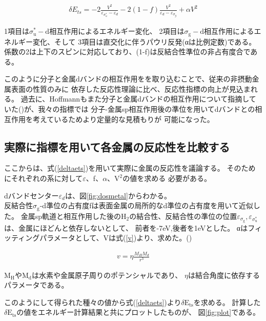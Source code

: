 \documentclass[12pt]{ltjsarticle}
\begin{document}
\begin{eqnarray}
    \label{deltaets}
    \delta E_{ts} = -2 \frac{ V^2 }{\varepsilon _{\sigma_u^*} - \varepsilon _d}
                    -2(1-f)\frac{V^2}{\varepsilon _d - \varepsilon _{\sigma_g}}
                    + \alpha V^2
\end{eqnarray}

1項目は$\sigma _\text{u}^* -\text{d}$相互作用によるエネルギー変化、
2項目は$\sigma _\text{g}-\text{d}$相互作用によるエネルギー変化、そして
3項目は直交化に伴うパウリ反発(αは比例定数)である。
係数の2は上下のスピンに対応しており、(1-f)は反結合性準位の非占有度合である。

このように分子と金属dバンドの相互作用をを取り込むことで、従来の非摂動金属表面の性質のみに
依存した反応性理論に比べ、反応性指標の向上が見込まれる。
過去に、Hoffmannもまた分子と金属dバンドの相互作用について指摘していた(\cite{Hoffman1988})が、我々の指標では
分子-金属sp相互作用後の準位を用いてdバンドとの相互作用を考えているためより定量的な見積もりが
可能になった。

\subsection{実際に指標を用いて各金属の反応性を比較する}
ここからは、式(\ref{deltaets})を用いて実際に金属の反応性を議論する。
そのためにそれぞれの系に対して$\varepsilon$、f、$\alpha$、$\text{V}^\text{2}$の値を求める
必要がある。

dバンドセンター$\varepsilon_d$は、図\ref{fig:dosmetal}からわかる。\\
反結合性$\sigma_\text{g}$-d準位の占有度fは表面金属の局所的なd準位の占有度を用いて近似した。
金属sp軌道と相互作用した後の$\text{H}_\text{2}$の結合性、反結合性の準位の位置$\varepsilon _
{\sigma_\text{g}},\varepsilon _{\sigma_\text{u}^*}$は、金属にほどんと依存しないとして、
前者を-7eV,後者を1eVとした。
αはフィッティングパラメータとして、Vは式(\ref{v})より、求めた。(\cite{Norskov1989})

\begin{eqnarray}
    \label{v}
    v = \eta \frac{ M_H M_d }{r^3}
\end{eqnarray}

$\text{M}_\text{H}$や$\text{M}_\text{d}$は水素や金属原子周りのポテンシャルであり、
$\eta$は結合角度に依存するパラメータである。

このようにして得られた種々の値から式(\ref{deltaets})より$\delta \text{E}_\text{ts}$を求める。
計算した$\delta \text{E}_\text{ts}$の値をエネルギー計算結果と共にプロットしたものが、
図\ref{fig:plot}である。
\end{document}
